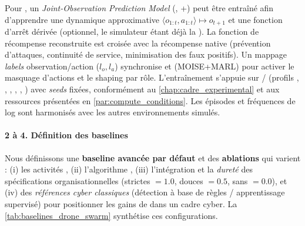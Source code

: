 Pour , un \textit{Joint-Observation Prediction Model} (, +) peut être entraîné afin d'apprendre une dynamique approximative $\langle o_{1:t}, a_{1:t} \rangle \mapsto o_{t+1}$ et une fonction d'arrêt dérivée (optionnel, le simulateur étant déjà la ). La fonction de récompense reconstruite est croisée avec la récompense native (prévention d'attaques, continuité de service, minimisation des faux positifs). Un mappage \emph{labels} observation/action ($l_o, l_a$) synchronise  et  (MOISE+MARL) pour activer le masquage d'actions et le shaping par rôle. L'entraînement s'appuie sur / (profils , , , , , ) avec \textit{seeds} fixées, conformément au \autoref{chap:cadre_experimental} et aux ressources présentées en \autoref{par:compute_conditions}. Les épisodes et fréquences de log sont harmonisés avec les autres environnements simulés.

\paragraph{2 à 4. Définition des baselines}

Nous définissons une \textbf{baseline avancée par défaut} et des \textbf{ablations} qui varient : (i) les activités , (ii) l'algorithme , (iii) l'intégration et la \textit{dureté} des spécifications organisationnelles (strictes $=1.0$, douces $=0.5$, sans $=0.0$), et (iv) des \textit{références cyber classiques} (détection à base de règles / apprentissage supervisé) pour positionner les gains de  dans un cadre cyber. La \autoref{tab:baselines_drone_swarm} synthétise ces configurations.


